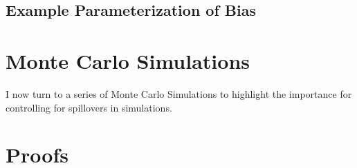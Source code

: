 \documentclass[11pt]{article}
\begin{document}
\subsection{Example Parameterization of Bias}




\section{Monte Carlo Simulations}

I now turn to a series of Monte Carlo Simulations to highlight the importance for controlling for spillovers in simulations. 




















\newpage \printbibliography


\newpage \appendix 
\renewcommand{\thetable}{\Alph{section}.\arabic{table}}

\section{Proofs}
\end{document}
